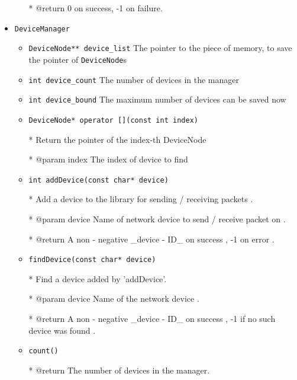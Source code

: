 \documentclass[11pt]{article}
\begin{document}
\begin{itemize}
\begin{itemize}
				* @return 0 on success, -1 on failure. 
				
			\end{itemize}
			
			\item \texttt{DeviceManager}
			
			\begin{itemize}
				\item \texttt{DeviceNode** device\_list} The pointer to the piece of memory, to save the pointer of \texttt{DeviceNode}s
				\item \texttt{int device\_count} The number of devices in the manager
				\item \texttt{int device\_bound} The maximum number of devices can be saved now
				\item \texttt{DeviceNode* operator [](const int index)}
				
				* Return the pointer of the index-th DeviceNode
				
				* @param index The index of device to find
				
				\item \texttt{int addDevice(const char* device)}
				
				* Add a device to the library for sending / receiving packets .
				
				* @param device Name of network device to send / receive packet on .
				
				* @return A non - negative \_device - ID\_ on success , -1 on error .
				
				\item \texttt{findDevice(const char* device)}
				
				* Find a device added by 'addDevice'.
				
				* @param device Name of the network device .
				
				* @return A non - negative \_device - ID\_ on success , -1 if no such device was found .
				
				\item \texttt{count()}
				
				* @return The number of devices in the manager.
			\end{itemize}
		\end{itemize}
	
	
\end{document}
